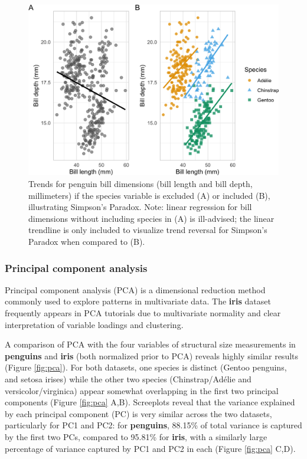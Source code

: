 \begin{Schunk}
\begin{figure}[htbp]

{\centering \includegraphics[width=1\linewidth]{figs/simpsons-1} 

}

\caption[Trends for penguin bill dimensions (bill length and bill depth, millimeters) if the species variable is excluded (A) or included (B), illustrating Simpson’s Paradox]{Trends for penguin bill dimensions (bill length and bill depth, millimeters) if the species variable is excluded (A) or included (B), illustrating Simpson’s Paradox. Note: linear regression for bill dimensions without including species in (A) is ill-advised; the linear trendline is only included to visualize trend reversal for Simpson’s Paradox when compared to (B).}\label{fig:simpsons}
\end{figure}
\end{Schunk}

\hypertarget{principal-component-analysis}{%
\subsubsection{Principal component
analysis}\label{principal-component-analysis}}

Principal component analysis (PCA) is a dimensional reduction method
commonly used to explore patterns in multivariate data. The
\textbf{iris} dataset frequently appears in PCA tutorials due to
multivariate normality and clear interpretation of variable loadings and
clustering.

A comparison of PCA with the four variables of structural size
measurements in \textbf{penguins} and \textbf{iris} (both normalized
prior to PCA) reveals highly similar results (Figure \ref{fig:pca}). For
both datasets, one species is distinct (Gentoo penguins, and setosa
irises) while the other two species (Chinstrap/Adélie and
versicolor/virginica) appear somewhat overlapping in the first two
principal components (Figure \ref{fig:pca} A,B). Screeplots reveal that
the variance explained by each principal component (PC) is very similar
across the two datasets, particularly for PC1 and PC2: for
\textbf{penguins}, 88.15\% of total variance is captured by the first
two PCs, compared to 95.81\% for \textbf{iris}, with a similarly large
percentage of variance captured by PC1 and PC2 in each (Figure
\ref{fig:pca} C,D).

